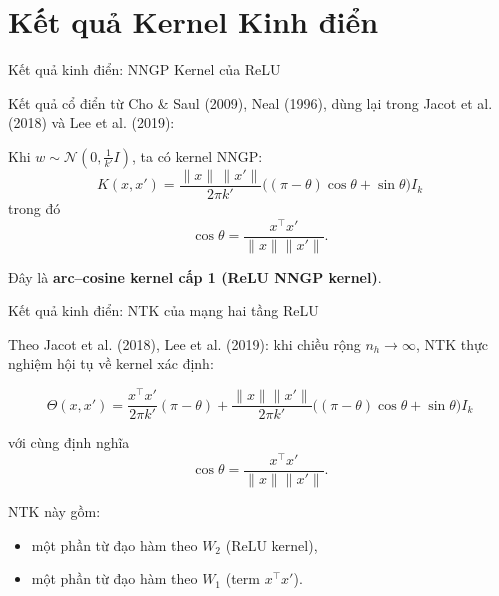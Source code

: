 \section{Kết quả Kernel Kinh điển}
\begin{frame}{Kết quả kinh điển: NNGP Kernel của ReLU}

Kết quả cổ điển từ Cho \& Saul (2009), Neal (1996), dùng lại trong
Jacot et al. (2018) và Lee et al. (2019):

\vspace{0.2cm}
Khi $w \sim \mathcal N(0,\tfrac{1}{k'}I)$, ta có kernel NNGP:
\[
K(x,x')
=
\frac{\|x\|\,\|x'\|}{2\pi k'}
\Big(
(\pi - \theta)\cos\theta + \sin\theta
\Big)
I_k
\]
trong đó
\[
\cos\theta
=
\frac{x^\top x'}{\|x\|\|x'\|}.
\]

\vspace{0.2cm}
Đây là \textbf{arc--cosine kernel cấp 1 (ReLU NNGP kernel)}.
\end{frame}

\begin{frame}{Kết quả kinh điển: NTK của mạng hai tầng ReLU}

Theo Jacot et al. (2018), Lee et al. (2019):
khi chiều rộng $n_h \to \infty$, NTK thực nghiệm hội tụ về
kernel xác định:

\[
\Theta(x,x')
=
\frac{x^\top x'}{2\pi k'}(\pi - \theta)
+
\frac{\|x\|\|x'\|}{2\pi k'}
\Big(
(\pi - \theta)\cos\theta + \sin\theta
\Big)
I_k
\]

với cùng định nghĩa
\[
\cos\theta = \frac{x^\top x'}{\|x\|\|x'\|}.
\]

\vspace{0.2cm}
NTK này gồm:
\begin{itemize}
    \item một phần từ đạo hàm theo $W_2$ (ReLU kernel),
    \item một phần từ đạo hàm theo $W_1$ (term $x^\top x'$).
\end{itemize}

\end{frame}
